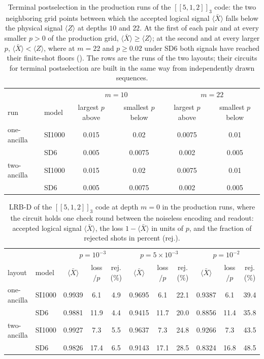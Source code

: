 \begin{table}[tp]
  \centering
  \small
  \begin{tabular}{ll|cc|cc}
    \hline
    & & \multicolumn{2}{c|}{$m = 10$} & \multicolumn{2}{c}{$m = 22$} \\
    run & model & largest $p$ above & smallest $p$ below & largest $p$ above & smallest $p$ below \\
    \hline
    one-ancilla & SI1000 & 0.015 & 0.02 & 0.0075 & 0.01 \\
     & SD6 & 0.005 & 0.0075 & 0.002 & 0.005 \\
    two-ancilla & SI1000 & 0.015 & 0.02 & 0.0075 & 0.01 \\
     & SD6 & 0.005 & 0.0075 & 0.002 & 0.005 \\
    \hline
  \end{tabular}
  \caption{Terminal postselection in the production runs of the $[[5,1,2]]_3$ code: the two neighboring grid points between which the accepted logical signal $\langle \bar{X} \rangle$ falls below the physical signal $\langle Z \rangle$ at depths $10$ and $22$. At the first of each pair and at every smaller $p > 0$ of the production grid, $\langle \bar{X} \rangle \ge \langle Z \rangle$; at the second and at every larger $p$, $\langle \bar{X} \rangle < \langle Z \rangle$, where at $m = 22$ and $p \ge 0.02$ under SD6 both signals have reached their finite-shot floors (). The rows are the runs of the two layouts; their circuits for terminal postselection are built in the same way from independently drawn sequences.}
  \label{tab:const0}
\end{table}

\begin{table}[tp]
  \centering
  \small
  \begin{tabular}{ll|ccc|ccc|ccc}
    \hline
    & & \multicolumn{3}{c|}{$p = 10^{-3}$} & \multicolumn{3}{c|}{$p = 5\times10^{-3}$} & \multicolumn{3}{c}{$p = 10^{-2}$} \\
    layout & model & $\langle \bar{X} \rangle$ & loss$/p$ & rej. (\%) & $\langle \bar{X} \rangle$ & loss$/p$ & rej. (\%) & $\langle \bar{X} \rangle$ & loss$/p$ & rej. (\%) \\
    \hline
    one-ancilla & SI1000 & 0.9939 & 6.1 & 4.9 & 0.9695 & 6.1 & 22.1 & 0.9387 & 6.1 & 39.4 \\
     & SD6 & 0.9881 & 11.9 & 4.4 & 0.9415 & 11.7 & 20.0 & 0.8856 & 11.4 & 35.8 \\
    two-ancilla & SI1000 & 0.9927 & 7.3 & 5.5 & 0.9637 & 7.3 & 24.8 & 0.9266 & 7.3 & 43.5 \\
     & SD6 & 0.9826 & 17.4 & 6.5 & 0.9143 & 17.1 & 28.5 & 0.8324 & 16.8 & 48.5 \\
    \hline
  \end{tabular}
  \caption{LRB-D of the $[[5,1,2]]_3$ code at depth $m = 0$ in the production runs, where the circuit holds one check round between the noiseless encoding and readout: accepted logical signal $\langle \bar{X} \rangle$, the loss $1 - \langle \bar{X} \rangle$ in units of $p$, and the fraction of rejected shots in percent (rej.).}
  \label{tab:m0}
\end{table}

